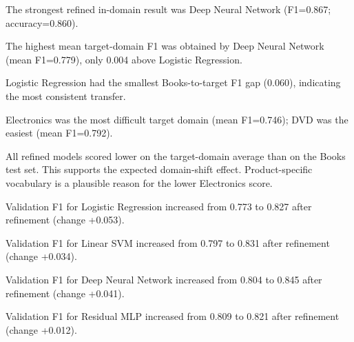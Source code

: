 The strongest refined in-domain result was Deep Neural Network (F1=0.867; accuracy=0.860).

The highest mean target-domain F1 was obtained by Deep Neural Network (mean F1=0.779), only 0.004 above Logistic Regression.

Logistic Regression had the smallest Books-to-target F1 gap (0.060), indicating the most consistent transfer.

Electronics was the most difficult target domain (mean F1=0.746); DVD was the easiest (mean F1=0.792).

All refined models scored lower on the target-domain average than on the Books test set. This supports the expected domain-shift effect. Product-specific vocabulary is a plausible reason for the lower Electronics score.

Validation F1 for Logistic Regression increased from 0.773 to 0.827 after refinement (change +0.053).

Validation F1 for Linear SVM increased from 0.797 to 0.831 after refinement (change +0.034).

Validation F1 for Deep Neural Network increased from 0.804 to 0.845 after refinement (change +0.041).

Validation F1 for Residual MLP increased from 0.809 to 0.821 after refinement (change +0.012).